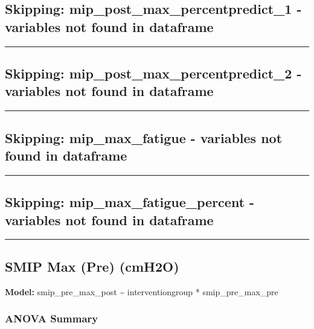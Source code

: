 \documentclass[
]{article}
\begin{document}
\subsection{Skipping: mip\_post\_max\_percentpredict\_1 - variables not
found in
dataframe}\label{skipping-mip_post_max_percentpredict_1---variables-not-found-in-dataframe}

\begin{center}\rule{0.5\linewidth}{0.5pt}\end{center}

\subsection{Skipping: mip\_post\_max\_percentpredict\_2 - variables not
found in
dataframe}\label{skipping-mip_post_max_percentpredict_2---variables-not-found-in-dataframe}

\begin{center}\rule{0.5\linewidth}{0.5pt}\end{center}

\subsection{Skipping: mip\_max\_fatigue - variables not found in
dataframe}\label{skipping-mip_max_fatigue---variables-not-found-in-dataframe}

\begin{center}\rule{0.5\linewidth}{0.5pt}\end{center}

\subsection{Skipping: mip\_max\_fatigue\_percent - variables not found
in
dataframe}\label{skipping-mip_max_fatigue_percent---variables-not-found-in-dataframe}

\begin{center}\rule{0.5\linewidth}{0.5pt}\end{center}

\subsection{SMIP Max (Pre) (cmH2O)}\label{smip-max-pre-cmh2o}

\textbf{Model:} smip\_pre\_max\_post \textasciitilde{} interventiongroup
* smip\_pre\_max\_pre

\subsubsection{ANOVA Summary}\label{anova-summary-35}
\end{document}
